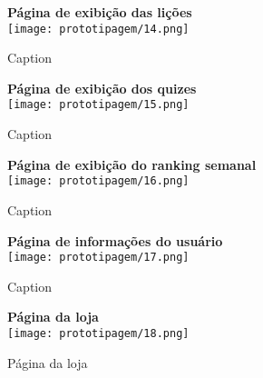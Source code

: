 \documentclass[
	article,			%
	12pt,				%
	oneside,			%
	a4paper,			%
	english,			%
	brazil,				%
	sumario=tradicional
	]{abntex2}
\begin{document}
\begin{apendicesenv}
\begin{figure}[!htbp]
    \centering
    \begin{minipage}{1\linewidth}
        \centering
        {\textbf{Página de exibição das lições}}\\[2mm]
        \texttt{[image: prototipagem/14.png]}
        \caption{Caption}
        \label{fig:prototipagem14}
    \end{minipage}
    \hfill
    \begin{minipage}{1\linewidth}
        \centering
        {\textbf{Página de exibição dos quizes}}\\[2mm]
        \texttt{[image: prototipagem/15.png]}
        \caption{Caption}
        \label{fig:prototipagem15}
    \end{minipage}
\end{figure}

\begin{figure}[!htbp]
    \centering
    \begin{minipage}{1\linewidth}
        \centering
        {\textbf{Página de exibição do ranking semanal}}\\[2mm]
        \texttt{[image: prototipagem/16.png]}
        \caption{Caption}
        \label{fig:prototipagem16}
    \end{minipage}
    \hfill
    \begin{minipage}{1\linewidth}
        \centering
        {\textbf{Página de informações do usuário}}\\[2mm]
        \texttt{[image: prototipagem/17.png]}
        \caption{Caption}
        \label{fig:prototipagem17}
    \end{minipage}
\end{figure}

\begin{figure}[!htbp]
    \centering

    \begin{minipage}{1\linewidth}
        \centering
        {\textbf{Página da loja}}\\[1mm] %
        \texttt{[image: prototipagem/18.png]}
        \caption{Página da loja}
        \label{fig:prototipagem18}
    \end{minipage}


\end{figure}
\end{apendicesenv}
\end{document}
